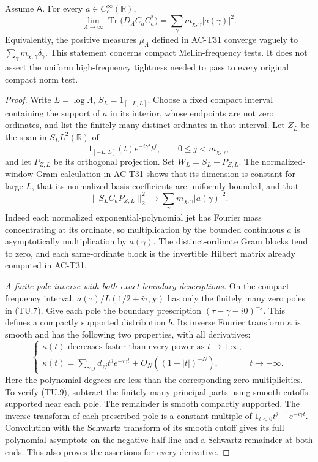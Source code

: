 \begin{theorem}
Assume \(\mathsf A\).  For every \(a\in C_c^\infty(\mathbb R)\),
\[
 \lim_{\Lambda\to\infty}
    \operatorname{Tr}\bigl(D_\Lambda C_aC_a^*\bigr)
                =\sum_\gamma m_{\chi,\gamma}|a(\gamma)|^2.
 \tag{TU.6}
\]
Equivalently, the positive measures \(\mu_\Lambda\)
defined in AC-T31 converge vaguely to
\(\sum_\gamma m_{\chi,\gamma}\delta_\gamma\).
This statement concerns compact Mellin-frequency tests.
It does not assert the uniform high-frequency tightness
needed to pass to every original compact norm test.
\end{theorem}
\begin{proof}
Write \(L=\log\Lambda\), \(S_L=1_{[-L,L]}\).
Choose a fixed compact interval containing the support of
\(a\) in its interior, whose endpoints are not zero ordinates,
and list the finitely many distinct ordinates in that interval.
Let \(Z_L\) be the span in \(S_LL^2(\mathbb R)\) of
\[
       1_{[-L,L]}(t)e^{-i\gamma t}t^j,
                         \qquad 0\leq j<m_{\chi,\gamma},
 \tag{TU.7}
\]
and let \(P_{Z,L}\) be its orthogonal projection.
Set \(W_L=S_L-P_{Z,L}\).
The normalized-window Gram calculation in AC-T31 shows that
its dimension is constant for large \(L\), that its normalized
basis coefficients are uniformly bounded, and that
\[
       \|S_LC_aP_{Z,L}\|_2^2
              \longrightarrow
                  \sum_\gamma m_{\chi,\gamma}|a(\gamma)|^2.
 \tag{TU.8}
\]
Indeed each normalized exponential-polynomial jet has Fourier
mass concentrating at its ordinate, so multiplication by the
bounded continuous \(a\) is asymptotically multiplication by
\(a(\gamma)\).  The distinct-ordinate Gram blocks tend to zero,
and each same-ordinate block is the invertible Hilbert matrix
already computed in AC-T31.

\emph{A finite-pole inverse with both exact boundary descriptions.}
On the compact frequency interval, \(a(\tau)/
L(1/2+i\tau,\chi)\) has only the finitely many zero poles
in (TU.7).  Give each pole the boundary prescription
\((\tau-\gamma-i0)^{-j}\).
This defines a compactly supported distribution \(b\).
Its inverse Fourier transform \(\kappa\) is smooth and has
the following two properties, with all derivatives:
\[
 \begin{cases}
 \kappa(t)\text{ decreases faster than every power as }t\to+\infty,\\
 \kappa(t)=\displaystyle\sum_{\gamma,j}d_{\gamma j}
                  t^je^{-i\gamma t}+O_N((1+|t|)^{-N}),
                                      &t\to-\infty .
 \end{cases}
 \tag{TU.9}
\]
Here the polynomial degrees are less than the corresponding
zero multiplicities.  To verify (TU.9), subtract the finitely
many principal parts using smooth cutoffs supported near each
pole.  The remainder is smooth compactly supported.
The inverse transform of each prescribed pole is a constant
multiple of \(1_{t<0}t^{j-1}e^{-i\gamma t}\).
Convolution with the Schwartz transform of its smooth cutoff
gives its full polynomial asymptote on the negative half-line
and a Schwartz remainder at both ends.  This also proves the
assertions for every derivative.


\end{proof}
